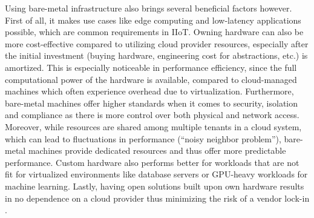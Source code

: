     Using bare-metal infrastructure also brings several beneficial factors however. First of all, it makes use cases like edge computing and low-latency applications possible, which are common requirements in IIoT. Owning hardware can also be more cost-effective compared to utilizing cloud provider resources, especially after the initial investment (buying hardware, engineering cost for abstractions, etc.) is amortized. This is especially noticeable in performance efficiency, since the full computational power of the hardware is available, compared to cloud-managed machines which often experience overhead due to virtualization. Furthermore, bare-metal machines offer higher standards when it comes to security, isolation and compliance as there is more control over both physical and network access. Moreover, while resources are shared among multiple tenants in a cloud system, which can lead to fluctuations in performance (``noisy neighbor problem''), bare-metal machines provide dedicated resources and thus offer more predictable performance. Custom hardware also performs better for workloads that are not fit for virtualized environments like database servers or GPU-heavy workloads for machine learning. Lastly, having open solutions built upon own hardware results in no dependence on a cloud provider thus minimizing the risk of a vendor lock-in \cite{building_future_on_metal}.

    
